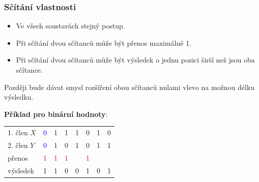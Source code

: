 	\begin{frame}
    \frametitle{Sčítání vlastnosti}
		\boldmath
    
    \begin{itemize}
      \item Ve všech soustavách stejný postup.
      \item Při sčítání dvou sčítanců může být přenos maximálně 1.
      \item Při sčítání dvou sčítanců může být výsledek o jednu pozici širší než jsou oba sčítance.
    \end{itemize}
    
    Později bude dávat smysl rozšíření obou sčítanců nulami vlevo na možnou délku výsledku.
    
    \vspace{4mm}
    \textbf{Příklad pro binární hodnoty}:
    \vspace{2mm}
      
    \boldmath
    \begin{center}
      \begin{tabular}{ p{20mm} c c c c c c c}
        1. člen $X$  & \textcolor{blue}{0} & 1 & 1 & 1 & 0 & 1 & 0 \\
        2. člen $Y$  & \textcolor{blue}{0} & 1 & 0 & 1 & 0 & 1 & 1 \\
        přenos       & \textcolor{red}{1}  & \textcolor{red}{1} & \textcolor{red}{1} &   & \textcolor{red}{1} &   &   \\
        \hline
        výsledek     &                  1  & 1 & 0 & 0 & 1 & 0 & 1 \\
      \end{tabular}
    \end{center}
    
	\end{frame}
  
